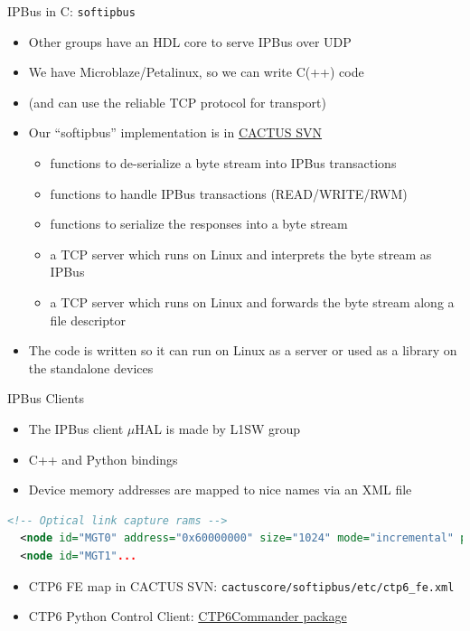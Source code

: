 \documentclass{beamer}
\begin{document}
\begin{frame}{IPBus in C: {\tt softipbus}}
\begin{itemize}
\item Other groups have an HDL core to serve IPBus over UDP
\item We have Microblaze/Petalinux, so we can write C(++) code
\item (and can use the reliable TCP protocol for transport)
\item Our ``softipbus'' implementation is in \href{https://svnweb.cern.ch/trac/cactus/browser/trunk/cactuscore/softipbus}{CACTUS SVN}
\begin{itemize}
\item functions to de-serialize a byte stream into IPBus transactions
\item functions to handle IPBus transactions (READ/WRITE/RWM)
\item functions to serialize the responses into a byte stream
\item a TCP server which runs on Linux and interprets the byte stream as IPBus
\item a TCP server which runs on Linux and forwards the byte stream along a file descriptor
\end{itemize}
\item The code is written so it can run on Linux as a server or used as a library on the standalone devices
\end{itemize}
\end{frame}

\begin{frame}[fragile]{IPBus Clients}
\begin{itemize}
\item The IPBus client $\mu$HAL is made by L1SW group
\item C++ and Python bindings
\item Device memory addresses are mapped to nice names via an XML file
\end{itemize}
\begin{lstlisting}[language=xml]
  <!-- Optical link capture rams -->
  <node id="MGT0" address="0x60000000" size="1024" mode="incremental" permission="r" description="Capture RAM for link #0"/>
  <node id="MGT1"...
\end{lstlisting}
\begin{itemize}
\item CTP6 FE map in CACTUS SVN: {\tt cactuscore/softipbus/etc/ctp6\_fe.xml}
\item CTP6 Python Control Client: \href{https://github.com/uwcms/ctp6commander/blob/master/api.py}{CTP6Commander package}
\end{itemize}

\end{frame}
\end{document}
